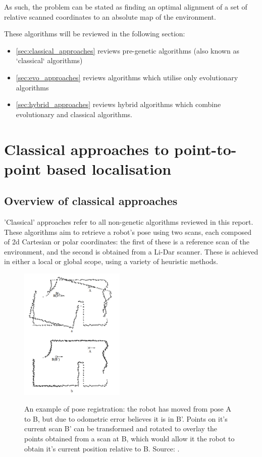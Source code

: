 \documentclass[authoryearcitations]{UoYCSproject}
\begin{document}
As such, the problem can be stated as finding an optimal alignment of a set of relative scanned coordinates to an absolute map of the environment.

These algorithms will be reviewed in the following section:
\begin{itemize}
	\item \autoref{sec:classical_approaches} reviews pre-genetic algorithms (also known as `classical` algorithms)
	\item \autoref{sec:evo_approaches} reviews algorithms which utilise only evolutionary algorithms
	\item \autoref{sec:hybrid_approaches} reviews hybrid algorithms which combine evolutionary and classical algorithms.
\end{itemize}


\section{Classical approaches to point-to-point based localisation}
\label{sec:classical_approaches}
\subsection{Overview of classical approaches}
'Classical' approaches refer to all non-genetic algorithms reviewed in this report. These algorithms aim to retrieve a robot's pose using two scans, each composed of 2d Cartesian or polar coordinates: the first of these is a reference scan of the environment, and the second is obtained from a Li-Dar scanner. These is achieved in either a local or global scope, using a variety of heuristic methods.
\begin{figure}[t]
	\centering
	\includegraphics[width=5cm,keepaspectratio]{images/pose_estimation.png}
	\label{fig:pose_estimation}
	\caption[An example of pose registration]{An example of pose registration: the robot has moved from pose A to B, but due to odometric error believes it is in B'. Points on it's current scan B' can be transformed and rotated to overlay the points obtained from a scan at B, which would allow it the robot to obtain it's current position relative to B. Source: \citet{Lu1997-zv}.}
\end{figure}
\end{document}
